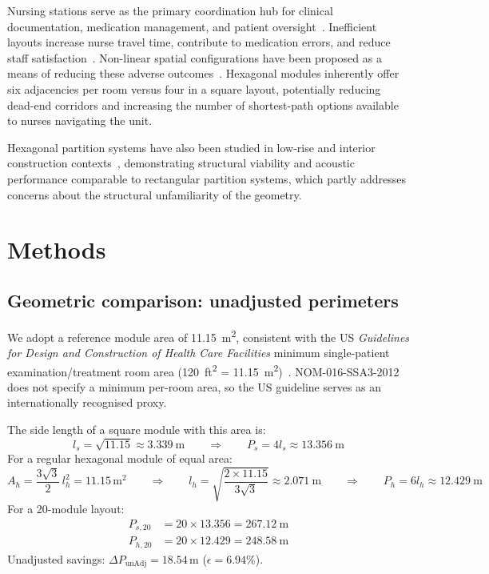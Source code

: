 \documentclass[12pt,a4paper]{article}
\begin{document}
Nursing stations serve as the primary coordination hub for clinical documentation,
medication management, and patient oversight~\cite{ulrich2008evidence}.
Inefficient layouts increase nurse travel time, contribute to medication errors,
and reduce staff satisfaction~\cite{friesen2008nursing}.
Non-linear spatial configurations have been proposed as a means of reducing these
adverse outcomes~\cite{ulrich2008evidence,zhong2022biophilic}.
Hexagonal modules inherently offer six adjacencies per room versus four in a
square layout, potentially reducing dead-end corridors and increasing the number
of shortest-path options available to nurses navigating the unit.

Hexagonal partition systems have also been studied in low-rise and interior
construction contexts~\cite{hexpartition2010}, demonstrating structural viability
and acoustic performance comparable to rectangular partition systems, which partly
addresses concerns about the structural unfamiliarity of the geometry.

\section{Methods}
\label{sec:methods}

\subsection{Geometric comparison: unadjusted perimeters}

We adopt a reference module area of \SI{11.15}{\metre\squared}, consistent with
the US \textit{Guidelines for Design and Construction of Health Care Facilities}
minimum single-patient examination/treatment room area (\SI{120}{ft\squared} =
\SI{11.15}{\metre\squared})~\cite{facilityguide2010}.
NOM-016-SSA3-2012 does not specify a minimum per-room area, so the US guideline
serves as an internationally recognised proxy.

The side length of a square module with this area is:
\begin{equation}
  l_s = \sqrt{11.15} \approx \SI{3.339}{\metre}
  \qquad\Rightarrow\qquad P_s = 4 l_s \approx \SI{13.356}{\metre}
\end{equation}
For a regular hexagonal module of equal area:
\begin{equation}
  A_h = \frac{3\sqrt{3}}{2}\,l_h^2 = 11.15\,\text{m}^2
  \qquad\Rightarrow\qquad
  l_h = \sqrt{\frac{2 \times 11.15}{3\sqrt{3}}} \approx \SI{2.071}{\metre}
  \qquad\Rightarrow\qquad P_h = 6 l_h \approx \SI{12.429}{\metre}
\end{equation}
For a 20-module layout:
\begin{align}
  P_{s,20} &= 20 \times 13.356 = \SI{267.12}{\metre} \\
  P_{h,20} &= 20 \times 12.429 = \SI{248.58}{\metre}
\end{align}
Unadjusted savings: $\Delta P_{\text{unAdj}} = 18.54\,\text{m}$ ($\epsilon = 6.94\%$).
\end{document}
